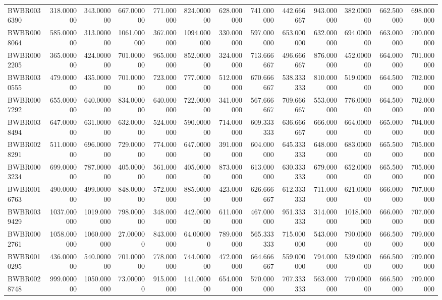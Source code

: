 \begin{longtable}{lrrrrrrrrrrrr}
BWBR0036390 & 318.000000 & 343.000000 & 667.000000 & 771.000000 & 824.000000 & 628.000000 & 741.000000 & 442.666667 & 943.000000 & 382.000000 & 662.500000 & 698.000000 \\
BWBR0008064 & 585.000000 & 313.000000 & 1061.000000 & 367.000000 & 1094.000000 & 330.000000 & 597.000000 & 653.000000 & 632.000000 & 694.000000 & 663.000000 & 700.000000 \\
BWBR0002205 & 365.000000 & 424.000000 & 701.000000 & 965.000000 & 852.000000 & 324.000000 & 713.666667 & 496.666667 & 876.000000 & 452.000000 & 664.000000 & 701.000000 \\
BWBR0030555 & 479.000000 & 435.000000 & 701.000000 & 723.000000 & 777.000000 & 512.000000 & 670.666667 & 538.333333 & 810.000000 & 519.000000 & 664.500000 & 702.000000 \\
BWBR0007292 & 655.000000 & 640.000000 & 834.000000 & 640.000000 & 722.000000 & 341.000000 & 567.666667 & 709.666667 & 553.000000 & 776.000000 & 664.500000 & 702.000000 \\
BWBR0038494 & 647.000000 & 631.000000 & 632.000000 & 524.000000 & 590.000000 & 714.000000 & 609.333333 & 636.666667 & 666.000000 & 664.000000 & 665.000000 & 704.000000 \\
BWBR0028291 & 511.000000 & 696.000000 & 729.000000 & 774.000000 & 647.000000 & 391.000000 & 604.000000 & 645.333333 & 648.000000 & 683.000000 & 665.500000 & 705.000000 \\
BWBR0003234 & 699.000000 & 787.000000 & 405.000000 & 561.000000 & 405.000000 & 873.000000 & 613.000000 & 630.333333 & 679.000000 & 652.000000 & 665.500000 & 705.000000 \\
BWBR0016763 & 490.000000 & 499.000000 & 848.000000 & 572.000000 & 885.000000 & 423.000000 & 626.666667 & 612.333333 & 711.000000 & 621.000000 & 666.000000 & 707.000000 \\
BWBR0039429 & 1037.000000 & 1019.000000 & 798.000000 & 348.000000 & 442.000000 & 611.000000 & 467.000000 & 951.333333 & 314.000000 & 1018.000000 & 666.000000 & 707.000000 \\
BWBR0002761 & 1058.000000 & 1060.000000 & 27.000000 & 843.000000 & 64.000000 & 789.000000 & 565.333333 & 715.000000 & 543.000000 & 790.000000 & 666.500000 & 709.000000 \\
BWBR0010295 & 436.000000 & 540.000000 & 701.000000 & 778.000000 & 744.000000 & 472.000000 & 664.666667 & 559.000000 & 794.000000 & 539.000000 & 666.500000 & 709.000000 \\
BWBR0028748 & 999.000000 & 1050.000000 & 73.000000 & 915.000000 & 141.000000 & 654.000000 & 570.000000 & 707.333333 & 563.000000 & 770.000000 & 666.500000 & 709.000000 \\

\end{longtable}
